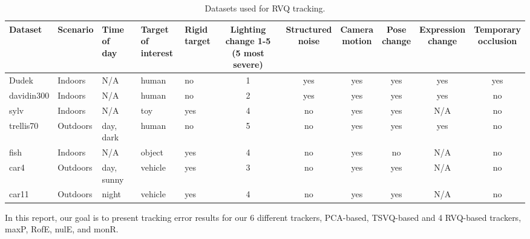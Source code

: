 \begin{table}[t]
\footnotesize
\begin{tabular}{p{0.6in}|p{0.6in}p{0.6in}p{0.4in}p{0.4in}cccccc}
Dataset 		&Scenario	     &\parbox[c]{0.4in}{\center Time of \\day} 	&\parbox[c]{0.26in}{\center Target of \\interest}  &\parbox{0.3in}{\center Rigid \\target} 	&\parbox{0.4in}{\center Lighting change 1-5 \\(5 most severe)}  	&\parbox{0.5in}{\center Structured \\noise} 	&\parbox{0.4in}{\center Camera \\motion} 	&\parbox{0.3in}{\center Pose \\change} 	&\parbox{0.45in}{\center Expression \\change} 	&\parbox{0.3in}{\center Temporary \\occlusion} 	\\\hline
Dudek 			&Indoors 	     &N/A 			&human 					&no 	&1 	&yes 	&yes 	&yes 	&yes 	&yes 		\\\hline
davidin300 	&Indoors		&N/A			&human					&no	&2	&yes	&yes	&yes	&yes	&no		\\\hline
sylv				&Indoors		&N/A			&toy						&yes	&4	&no	&yes	&yes	&N/A	&no		\\\hline
trellis70	 		&Outdoors 		&day, dark		&human					&no	&5	&no	&yes	&yes	&yes	&no		\\\hline
fish				&Indoors		&N/A			&object					&yes	&4	&no	&yes	&no	&N/A	&no		\\\hline
car4			&Outdoors 		&day, sunny	&vehicle					&yes	&3	&no	&yes	&yes	&N/A	&no		\\\hline
car11			&Outdoors		&night			&vehicle					&yes	&4	&no	&yes	&yes	&N/A	&no		\\\hline
\end{tabular}
\caption{Datasets used for RVQ tracking.}
\label{Tab:datasets_used}
\end{table}

In this report, our goal is to present tracking error results for our 6 different trackers, PCA-based, TSVQ-based and 4 RVQ-based trackers, maxP, RofE, nulE, and monR.


